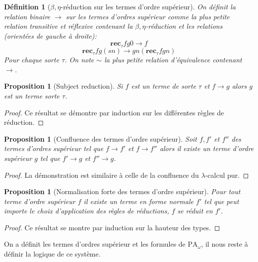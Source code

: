 \documentclass[a4paper,12pt]{article}
\newtheorem{prop}[theo]{Proposition}
\newtheorem{defi}[theo]{Définition}
\theoremstyle{rmqstyle}
\newcommand{\PA}{\mathrm{PA}}
\newcommand{\rec}{\mathbf{rec}}
\begin{document}
\begin{defi}[$\beta, \eta$-réduction sur les termes d'ordre supérieur]
On définit la relation binaire $\longrightarrow$ sur les termes d'ordres supérieur comme la plus petite relation transitive et réflexive contenant la $\beta, \eta$-réduction et les relations (orientées de gauche à droite):
$$ \rec_\tau f g 0 \longrightarrow f$$
$$\rec_\tau f g (sn) \longrightarrow g n (\rec_\tau f g n)$$
Pour chaque sorte $\tau$. On note $\sim$ la plus petite relation d'équivalence contenant $\longrightarrow$.
\end{defi}

\begin{prop}[Subject reduction]
Si $f$ est un terme de sorte $\tau$ et $f \longrightarrow g$ alors $g$ est un terme sorte $\tau$. 
\end{prop}

\begin{proof}
Ce résultat se démontre par induction sur les différentes règles de réduction. 
\end{proof}

\begin{prop}[Confluence des termes d'ordre supérieur]
Soit $f, f'$ et $f''$ des termes d'ordres supérieur tel que $f \longrightarrow f'$ et $f \longrightarrow f''$ alors il existe un terme d'ordre supérieur $g$ tel que $f' \longrightarrow g$ et $f'' \longrightarrow g$.
\end{prop}

\begin{proof}
La démonstration est similaire à celle de la confluence du $\lambda$-calcul pur.
\end{proof}

\begin{prop}[Normalisation forte des termes d'ordre supérieur]
Pour tout terme d'ordre supérieur $f$ il existe un terme en forme normale $f'$ tel que peut importe le choix d'application des règles de réductions, $f$ se réduit en $f'$.
\end{prop}

\begin{proof}
Ce résultat se montre par induction sur la hauteur des types.
\end{proof}

On a définit les termes d'ordres supérieur et les formules de $\PA_\omega$, il nous reste à définir la logique de ce système. 
\end{document}
